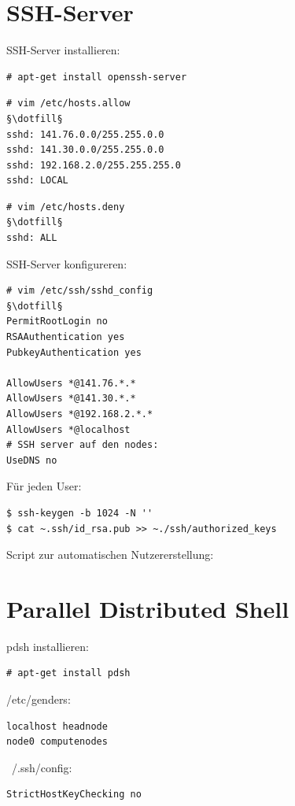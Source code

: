 \section{SSH-Server}
SSH-Server installieren:
\begin{lstlisting}[style=Bash]
# apt-get install openssh-server 
\end{lstlisting}
\begin{lstlisting}[style=Bash]
# vim /etc/hosts.allow
§\dotfill§
sshd: 141.76.0.0/255.255.0.0
sshd: 141.30.0.0/255.255.0.0
sshd: 192.168.2.0/255.255.255.0
sshd: LOCAL 
\end{lstlisting}
\begin{lstlisting}[style=Bash]
# vim /etc/hosts.deny
§\dotfill§
sshd: ALL
\end{lstlisting}

SSH-Server konfigureren:
\begin{lstlisting}[style=Bash]
# vim /etc/ssh/sshd_config
§\dotfill§
PermitRootLogin no
RSAAuthentication yes
PubkeyAuthentication yes

AllowUsers *@141.76.*.*
AllowUsers *@141.30.*.*
AllowUsers *@192.168.2.*.*
AllowUsers *@localhost
# SSH server auf den nodes:
UseDNS no
\end{lstlisting}
Für jeden User:
\begin{lstlisting}[style=Bash]
$ ssh-keygen -b 1024 -N ''
$ cat ~.ssh/id_rsa.pub >> ~./ssh/authorized_keys
\end{lstlisting}
Script zur automatischen Nutzererstellung:

\section{Parallel Distributed Shell}
pdsh installieren:
\begin{lstlisting}[style=Bash]
# apt-get install pdsh
\end{lstlisting}
/etc/genders:
\begin{lstlisting}[style=Bash]
localhost headnode
node0 computenodes
\end{lstlisting}
~/.ssh/config:
\begin{lstlisting}[style=Bash]
StrictHostKeyChecking no
\end{lstlisting}

